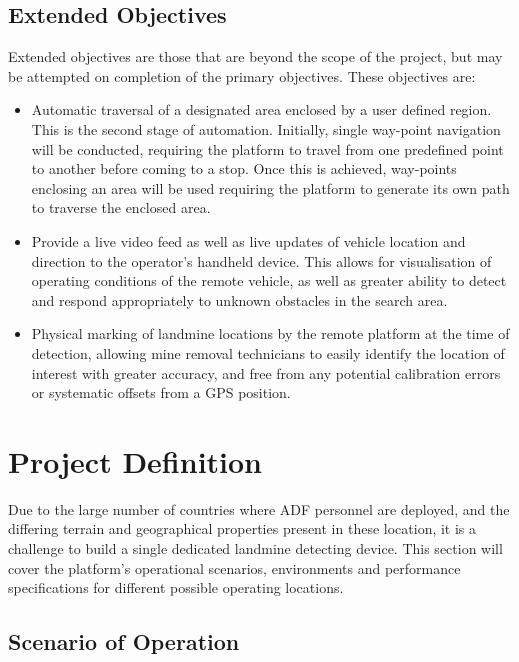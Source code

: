 \documentclass[main.tex]{subfiles}
\begin{document}
\subsection{Extended Objectives}
Extended objectives are those that are beyond the scope of the project, but may be attempted on completion of the primary objectives. These objectives are:

\begin{itemize}
\item Automatic traversal of a designated area enclosed by a user defined region. This is the second stage of automation. Initially, single way-point navigation will be conducted, requiring the platform to travel from one predefined point to another before coming to a stop. Once this is achieved, way-points enclosing an area will be used requiring the platform to generate its own path to traverse the enclosed area.
\item Provide a live video feed as well as live updates of vehicle location and direction to the operator's handheld device. This allows for visualisation of operating conditions of the remote vehicle, as well as greater ability to detect and respond appropriately to unknown obstacles in the search area.
\item Physical marking of landmine locations by the remote platform at the time of detection, allowing mine removal technicians to easily identify the location of interest with greater accuracy, and free from any potential calibration errors or systematic offsets from a GPS position.
\end{itemize}

\section{Project Definition}
Due to the large number of countries where ADF personnel are deployed, and the differing terrain and geographical properties present in these location, it is a challenge to build a single dedicated landmine detecting device. This section will cover the platform's operational scenarios, environments and performance specifications for different possible operating locations. 

\subsection{Scenario of Operation}
\end{document}
